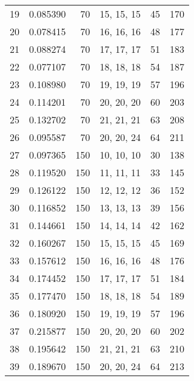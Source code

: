 \begin{tabular}{lrrlrr}
19 &      0.085390 &               70 &     15, 15, 15 &            45 &          170 \\
20 &      0.078415 &               70 &     16, 16, 16 &            48 &          177 \\
21 &      0.088274 &               70 &     17, 17, 17 &            51 &          183 \\
22 &      0.077107 &               70 &     18, 18, 18 &            54 &          187 \\
23 &      0.108980 &               70 &     19, 19, 19 &            57 &          196 \\
24 &      0.114201 &               70 &     20, 20, 20 &            60 &          203 \\
25 &      0.132702 &               70 &     21, 21, 21 &            63 &          208 \\
26 &      0.095587 &               70 &     20, 20, 24 &            64 &          211 \\
27 &      0.097365 &              150 &     10, 10, 10 &            30 &          138 \\
28 &      0.119520 &              150 &     11, 11, 11 &            33 &          145 \\
29 &      0.126122 &              150 &     12, 12, 12 &            36 &          152 \\
30 &      0.116852 &              150 &     13, 13, 13 &            39 &          156 \\
31 &      0.144661 &              150 &     14, 14, 14 &            42 &          162 \\
32 &      0.160267 &              150 &     15, 15, 15 &            45 &          169 \\
33 &      0.157612 &              150 &     16, 16, 16 &            48 &          176 \\
34 &      0.174452 &              150 &     17, 17, 17 &            51 &          184 \\
35 &      0.177470 &              150 &     18, 18, 18 &            54 &          189 \\
36 &      0.180920 &              150 &     19, 19, 19 &            57 &          196 \\
37 &      0.215877 &              150 &     20, 20, 20 &            60 &          202 \\
38 &      0.195642 &              150 &     21, 21, 21 &            63 &          210 \\
39 &      0.189670 &              150 &     20, 20, 24 &            64 &          213 \\

\end{tabular}
